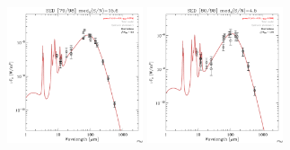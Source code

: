 \documentclass[preprint2,longabstract]{aastex}
\begin{document}
\begin{figure}
    \includegraphics[trim=0 2mm 0 0, clip, width=40mm]{SEDs/sed_79.pdf}
	\includegraphics[trim=0 2mm 0 0, clip, width=40mm]{SEDs/sed_80.pdf}
\end{figure}
\end{document}
